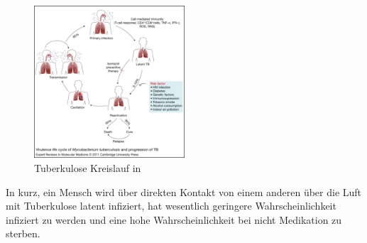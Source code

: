 \documentclass[paper=a4, fontsize=11pt, ngerman, abstract=on]{scrartcl}
\numberwithin{equation}{section} %
\numberwithin{figure}{section} %
\numberwithin{table}{section} %
\begin{document}
\begin{figure}[ht]
\centering
\includegraphics[width=0.5\textwidth,keepaspectratio]{images/tuberculosis-cycle}
\caption{Tuberkulose Kreislauf in \cite{Kumar2011}}
\label{fig:tuberculosis-cycle}
\end{figure}

In kurz, ein Mensch wird über direkten Kontakt von einem anderen über die Luft mit Tuberkulose latent infiziert, hat wesentlich geringere Wahrscheinlichkeit infiziert zu werden und eine hohe Wahrscheinlichkeit bei nicht Medikation zu sterben.
\end{document}
